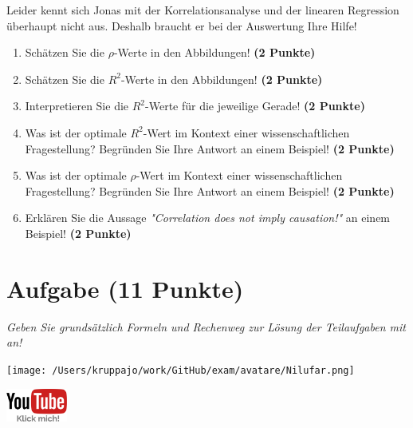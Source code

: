 \documentclass[a4paper, 9pt]{scrartcl}\usepackage[]{graphicx}\usepackage[]{xcolor}
\begin{document}
Leider kennt sich Jonas mit der Korrelationsanalyse und der linearen Regression überhaupt nicht aus. Deshalb braucht er bei der Auswertung Ihre Hilfe!

\begin{enumerate}
\item Schätzen Sie die $\rho$-Werte in den Abbildungen! \textbf{(2 Punkte)}
\item Schätzen Sie die $R^2$-Werte in den Abbildungen! \textbf{(2 Punkte)}
\item Interpretieren Sie die $R^2$-Werte für die jeweilige Gerade! \textbf{(2 Punkte)}
\item Was ist der optimale $R^2$-Wert im Kontext einer wissenschaftlichen Fragestellung? Begründen Sie Ihre Antwort an einem Beispiel! \textbf{(2 Punkte)}
\item Was ist der optimale $\rho$-Wert im Kontext einer wissenschaftlichen Fragestellung? Begründen Sie Ihre Antwort an einem Beispiel! \textbf{(2 Punkte)}
\item Erklären Sie die Aussage \textit{"Correlation does not imply causation!"} an einem Beispiel! \textbf{(2 Punkte)}
\end{enumerate} 
\clearpage

\section{Aufgabe \hfill (11 Punkte)}

\textit{Geben Sie grundsätzlich Formeln und Rechenweg zur Lösung der Teilaufgaben mit an!} \\[1Ex]
 

 
\begin{minipage}[t]{0.5\textwidth}
\texttt{[image: /Users/kruppajo/work/GitHub/exam/avatare/Nilufar.png]}
\end{minipage}
\begin{minipage}[t]{0.5\textwidth}
\hfill
\href{https://youtu.be/dyQlYV9nOqY}{\includegraphics[width = 2cm]{img/youtube}}
\end{minipage}
\vspace{-3ex}
\end{document}
